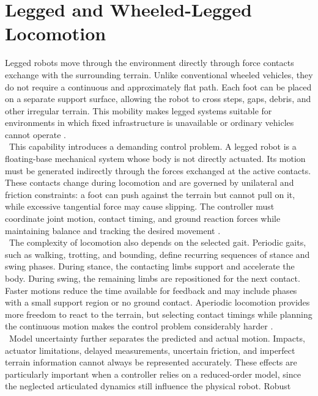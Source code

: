 \section{Legged and Wheeled-Legged Locomotion}
\label{sec:legged_wheeled_legged_locomotion}

Legged robots move through the environment directly through force contacts
exchange with the surrounding terrain. Unlike conventional wheeled
vehicles, they do not require a continuous and approximately flat path. Each
foot can be placed on a separate support surface, allowing the robot to cross
steps, gaps, debris, and other irregular terrain. This mobility makes legged
systems suitable for environments in which fixed infrastructure is unavailable
or ordinary vehicles cannot operate \cite{legged_optimization}.\\
\
This capability introduces a demanding control problem. A legged robot is a
floating-base mechanical system whose body is not directly actuated. Its motion
must be generated indirectly through the forces exchanged at the active
contacts. These contacts change during locomotion and are governed by
unilateral and friction constraints: a foot can push against the terrain but
cannot pull on it, while excessive tangential force may cause slipping. The
controller must coordinate joint motion, contact timing, and ground reaction
forces while maintaining balance and tracking the desired movement
\cite{legged_optimization}.\\
\
The complexity of locomotion also depends on the selected gait. Periodic gaits,
such as walking, trotting, and bounding, define recurring sequences of stance
and swing phases. During stance, the contacting limbs support and accelerate
the body. During swing, the remaining limbs are repositioned for the next
contact. Faster motions reduce the time available for feedback and may include
phases with a small support region or no ground contact. Aperiodic locomotion
provides more freedom to react to the terrain, but selecting contact timings
while planning the continuous motion makes the control problem considerably
harder \cite{legged_optimization,non_gaited}.\\
\
Model uncertainty further separates the predicted and actual motion. Impacts,
actuator limitations, delayed measurements, uncertain friction, and imperfect
terrain information cannot always be represented accurately. These effects are
particularly important when a controller relies on a reduced-order model, since
the neglected articulated dynamics still influence the physical robot. Robust
